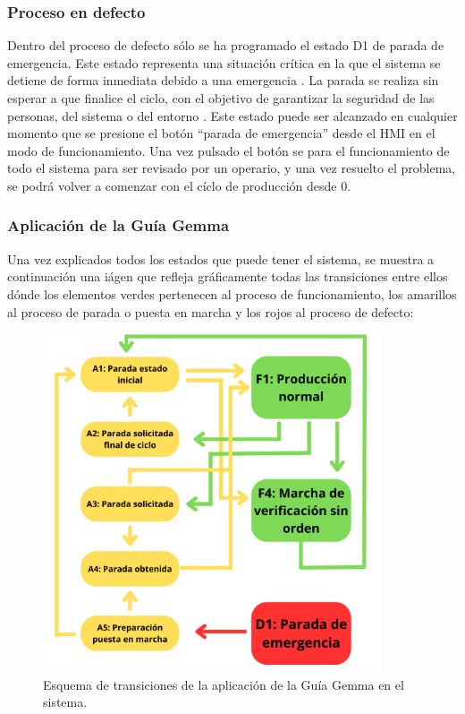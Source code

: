 \clearpage

\subsubsection{Proceso en defecto}

Dentro del proceso de defecto sólo se ha programado el estado D1 de parada de emergencia. Este estado representa una situación crítica en la que el sistema se detiene de forma inmediata debido a una emergencia \cite{guia_gemma}. La parada se realiza sin esperar a que finalice el ciclo, con el objetivo de garantizar la seguridad de las personas, del sistema o del entorno \cite{guia_gemma}. Este estado puede ser alcanzado en cualquier momento que se presione el botón ``parada de emergencia'' desde el HMI en el modo de funcionamiento. Una vez pulsado el botón se para el funcionamiento de todo el sistema para ser revisado por un operario, y una vez resuelto el problema, se podrá volver a comenzar con el cíclo de producción desde 0.

\subsubsection{Aplicación de la Guía Gemma}

Una vez explicados todos los estados que puede tener el sistema, se muestra a continuación una iágen que refleja gráficamente todas las transiciones entre ellos dónde los elementos verdes pertenecen al proceso de funcionamiento, los amarillos al proceso de parada o puesta en marcha y los rojos al proceso de defecto:

\begin{figure}[h!]
  \begin{center}
  	\includegraphics[width=10cm]{figs/guia_gemma_final}
  \end{center}
  \caption{\centering Esquema de transiciones de la aplicación de la Guía Gemma en el sistema.}
  \label{fig:guia_gemma_final}
\end{figure}

